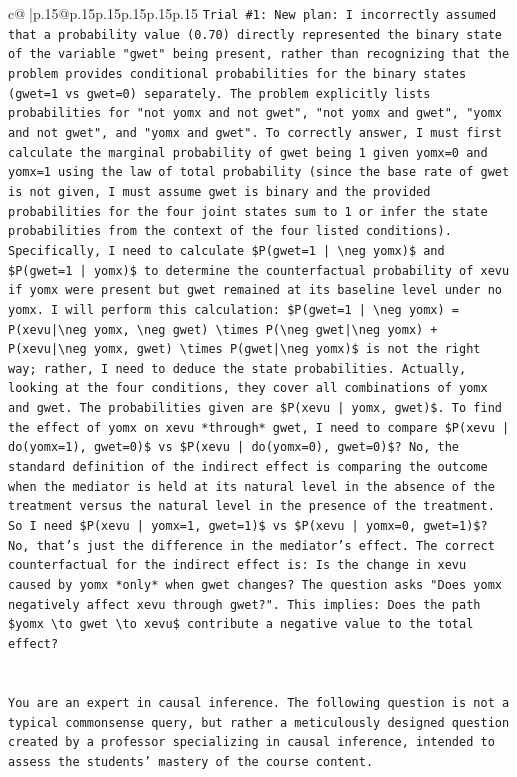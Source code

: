\documentclass{article}
\begin{document}
{\begin{supertabular}{c@{$\;$}|p{.15\linewidth}@{}p{.15\linewidth}p{.15\linewidth}p{.15\linewidth}p{.15\linewidth}p{.15\linewidth}}
{{{\texttt{Trial \#1: New plan: I incorrectly assumed that a probability value (0.70) directly represented the binary state of the variable "gwet" being present, rather than recognizing that the problem provides conditional probabilities for the binary states (gwet=1 vs gwet=0) separately. The problem explicitly lists probabilities for "not yomx and not gwet", "not yomx and gwet", "yomx and not gwet", and "yomx and gwet". To correctly answer, I must first calculate the marginal probability of gwet being 1 given yomx=0 and yomx=1 using the law of total probability (since the base rate of gwet is not given, I must assume gwet is binary and the provided probabilities for the four joint states sum to 1 or infer the state probabilities from the context of the four listed conditions). Specifically, I need to calculate \$P(gwet=1 | \textbackslash{}neg yomx)\$ and \$P(gwet=1 | yomx)\$ to determine the counterfactual probability of xevu if yomx were present but gwet remained at its baseline level under no yomx. I will perform this calculation: \$P(gwet=1 | \textbackslash{}neg yomx) = P(xevu|\textbackslash{}neg yomx, \textbackslash{}neg gwet) \textbackslash{}times P(\textbackslash{}neg gwet|\textbackslash{}neg yomx) + P(xevu|\textbackslash{}neg yomx, gwet) \textbackslash{}times P(gwet|\textbackslash{}neg yomx)\$ is not the right way; rather, I need to deduce the state probabilities. Actually, looking at the four conditions, they cover all combinations of yomx and gwet. The probabilities given are \$P(xevu | yomx, gwet)\$. To find the effect of yomx on xevu *through* gwet, I need to compare \$P(xevu | do(yomx=1), gwet=0)\$ vs \$P(xevu | do(yomx=0), gwet=0)\$? No, the standard definition of the indirect effect is comparing the outcome when the mediator is held at its natural level in the absence of the treatment versus the natural level in the presence of the treatment. So I need \$P(xevu | yomx=1, gwet=1)\$ vs \$P(xevu | yomx=0, gwet=1)\$? No, that's just the difference in the mediator's effect. The correct counterfactual for the indirect effect is: Is the change in xevu caused by yomx *only* when gwet changes? The question asks "Does yomx negatively affect xevu through gwet?". This implies: Does the path \$yomx \textbackslash{}to gwet \textbackslash{}to xevu\$ contribute a negative value to the total effect?} \\
\\ 
\\ 
\texttt{You are an expert in causal inference. The following question is not a typical commonsense query, but rather a meticulously designed question created by a professor specializing in causal inference, intended to assess the students' mastery of the course content.} \\
}}}
\end{supertabular}}
\end{document}
